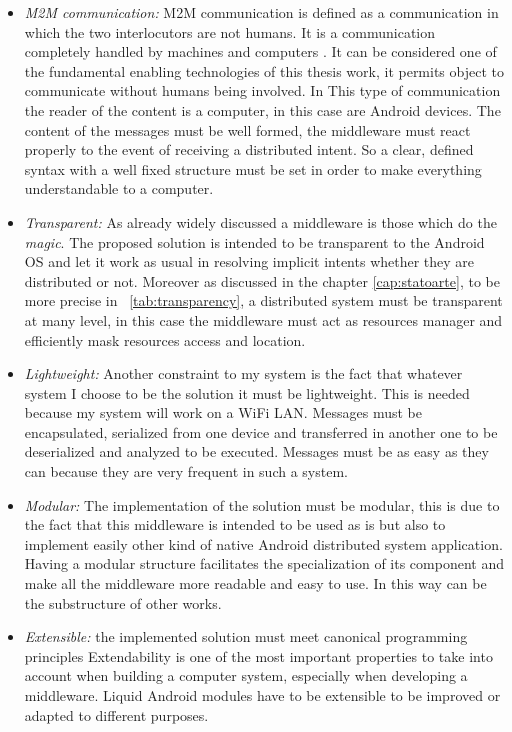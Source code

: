 \begin{itemize}
	\item \textit{M2M communication:} M2M communication is defined as a communication in which the two interlocutors are not humans. It is a communication completely handled by machines and computers \cite{cha2009trust}. It can be considered one of the fundamental enabling technologies of this thesis work, it permits object to communicate without humans being involved. In This type of communication the reader of the content is a computer, in this case are Android devices. The content of the messages must be well formed, the middleware must react properly to the event of receiving a distributed intent. So a clear, defined syntax with a well fixed structure  must be set in order to make everything understandable to a computer.
	
	\item \textit{Transparent:} As already widely discussed a middleware is those which do the \textit{magic}. The proposed solution is intended to be transparent to the Android OS and let it work as usual in resolving implicit intents whether they are distributed or not. Moreover as discussed in the chapter \ref{cap:statoarte}, to be more precise in \tablename~\ref{tab:transparency}, a distributed system must be transparent at many level, in this case the middleware must act as resources manager and efficiently mask resources access and location.
	
	
	\item \textit{Lightweight:} Another constraint to my system is the fact that whatever system I choose to be the solution it must be lightweight. This is needed because my system will work on a WiFi LAN. Messages must be encapsulated, serialized from one device and transferred in another one to be deserialized and analyzed to be executed. Messages must be as easy as they can because they are very frequent in such a system.
	
	\item \textit{Modular:} The implementation of the solution must be modular, this is due to the fact that this middleware is intended to be used as is but also to implement easily other kind of native Android distributed system application. Having a modular structure facilitates the specialization of its component and make all the middleware more readable and easy to use. In this way  can be the substructure of other works.
	
	\item \textit{Extensible:} the implemented solution must meet canonical programming principles Extendability is one of the most important properties to take into account when building a computer system, especially when developing a middleware. Liquid Android modules have to be extensible to be improved or adapted to different purposes.
		

\end{itemize}
